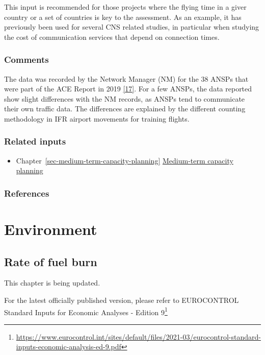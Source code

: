\documentclass[
  11pt,
  a4paper,
]{book}
\providecommand{\tightlist}{%
  \setlength{\itemsep}{0pt}\setlength{\parskip}{0pt}}\usepackage{longtable,booktabs,array}
\DeclareRobustCommand{\href}[2]{#2\footnote{\url{#1}}}
\begin{document}
This input is recommended for those projects where the flying time in a
giver country or a set of countries is key to the assessment. As an
example, it has previously been used for several CNS related studies, in
particular when studying the cost of communication services that depend
on connection times.

\hypertarget{comments}{%
\section{Comments}\label{comments}}

The data was recorded by the Network Manager (NM) for the 38 ANSPs that
were part of the ACE Report in 2019
\protect\hyperlink{ref-ace2019}{{[}17{]}}. For a few ANSPs, the data
reported show slight differences with the NM records, as ANSPs tend to
communicate their own traffic data. The differences are explained by the
different counting methodology in IFR airport movements for training
flights.

\hypertarget{related-inputs-4}{%
\section{Related inputs}\label{related-inputs-4}}

\begin{itemize}
\tightlist
\item
  Chapter~\ref{sec-medium-term-capacity-planning}
  \protect\hyperlink{sec-medium-term-capacity-planning}{Medium-term
  capacity planning}
\end{itemize}

\hypertarget{references-5}{%
\section{References}\label{references-5}}

\part{Environment}

\hypertarget{sec-rate-of-fuel-burn}{%
\chapter{Rate of fuel burn}\label{sec-rate-of-fuel-burn}}

This chapter is being updated.

For the latest officially published version, please refer to
\href{https://www.eurocontrol.int/sites/default/files/2021-03/eurocontrol-standard-inputs-economic-analysis-ed-9.pdf}{EUROCONTROL
Standard Inputs for Economic Analyses - Edition 9}
\end{document}
